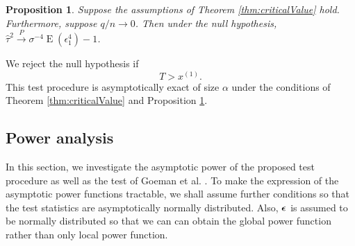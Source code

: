 \documentclass[bj]{imsart}
\DeclareMathOperator{\myE}{E}
\theoremstyle{plain}
\newtheorem{proposition}{\quad\quad Proposition}
\theoremstyle{definition}
\theoremstyle{remark}
\begin{document}
\begin{proposition}\label{prop:estimation}
    Suppose the assumptions of Theorem \ref{thm:criticalValue} hold.
    Furthermore, suppose $q/n\to 0$.
    Then under the null hypothesis, $\hat \tau^2 \xrightarrow{P} \sigma^{-4} \myE (\epsilon_1^4)-1$.
\end{proposition}
We reject the null hypothesis if 
\begin{equation*}
    T > x^{(1)}.
\end{equation*}
This test procedure is asymptotically exact of size $\alpha$ under the conditions of Theorem \ref{thm:criticalValue} and Proposition \ref{prop:estimation}.


\subsection{Power analysis}\label{sec:Power}
In this section, we investigate the asymptotic power of the proposed test procedure as well as the test of Goeman {\rm et al.} \cite{Goeman2006}.
To make the expression of the asymptotic power functions tractable, we shall assume further conditions so that the test statistics are asymptotically normally distributed.
Also, $\boldsymbol{\epsilon}$ is assumed to be normally distributed so that we can can obtain the global power function rather than only local power function.
\end{document}
